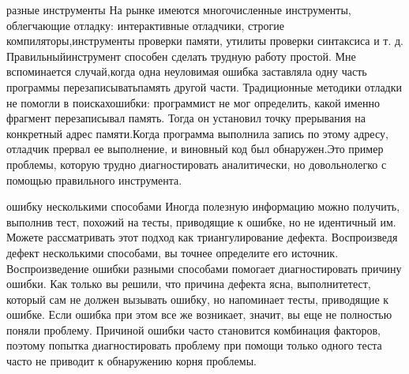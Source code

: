 \documentclass[a4paper]{article}
\begin{document}
{  разные  инструменты} На  рынке  имеются  многочисленные  инструменты, облегчающие отладку: интерактивные отладчики, строгие компиляторы,инструменты  проверки  памяти,  утилиты  проверки  синтаксиса  и  т.  д.  Правильныйинструмент способен сделать трудную работу простой. Мне вспоминается случай,когда одна неуловимая ошибка заставляла одну часть программы перезаписыватьпамять  другой  части.  Традиционные  методики  отладки  не  помогли  в  поискахошибки:  программист  не  мог  определить,  какой  именно  фрагмент  перезаписывал  память.  Тогда  он  установил  точку  прерывания  на  конкретный  адрес  памяти.Когда  программа  выполнила  запись  по  этому  адресу,  отладчик  прервал  ее  выполнение,  и  виновный  код  был  обнаружен.Это пример проблемы, которую трудно диагностировать аналитически, но довольнолегко  с  помощью  правильного  инструмента.

{  ошибку  несколькими  способами} Иногда  полезную  информацию  можно  получить,  выполнив  тест,  похожий  на  тесты,  приводящие  к  ошибке, но не идентичный им. Можете рассматривать этот подход как триангулирование  дефекта.  Воспроизведя  дефект  несколькими  способами,  вы  точнее  определите  его  источник. Воспроизведение ошибки разными способами помогает диагностировать причину ошибки. Как только вы решили, что причина дефекта ясна, выполнитетест,  который  сам  не  должен  вызывать  ошибку,  но  напоминает  тесты,  приводящие  к  ошибке.  Если  ошибка  при  этом  все  же  возникает,  значит,  вы  еще  не  полностью  поняли  проблему.  Причиной  ошибки  часто  становится  комбинация  факторов,  поэтому  попытка  диагностировать  проблему  при  помощи  только  одного  теста  часто  не  приводит  к  обнаружению  корня  проблемы.

\begin{figure}[h]
\end{figure}
\end{document}
